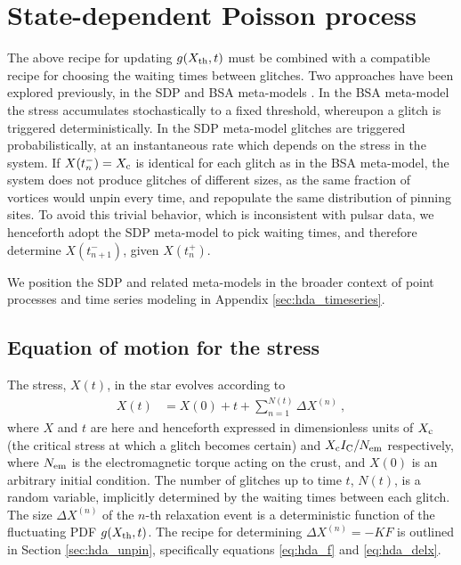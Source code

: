 \section{State-dependent Poisson process} \label{sec:hda_sdp}
The above recipe for updating $g(X_{\rm th},t)$ must be combined with a compatible recipe for choosing the waiting times between glitches. Two approaches have been explored previously, in the SDP \citep{Fulgenzi2017, Carlin2019quasi} and BSA meta-models \citep{Carlin2020bsa}. In the BSA meta-model the stress accumulates stochastically to a fixed threshold, whereupon a glitch is triggered deterministically. In the SDP meta-model glitches are triggered probabilistically, at an instantaneous rate which depends on the stress in the system. If $X(t_n^-) = X_\textrm{c}$ is identical for each glitch as in the BSA meta-model, the system does not produce glitches of different sizes, as the same fraction of vortices would unpin every time, and repopulate the same distribution of pinning sites. To avoid this trivial behavior, which is inconsistent with pulsar data, we henceforth adopt the SDP meta-model to pick waiting times, and therefore determine $X(t_{n+1}^-)$, given $X(t_n^+)$.

We position the SDP and related meta-models in the broader context of point processes and time series modeling in Appendix \ref{sec:hda_timeseries}.

\subsection{Equation of motion for the stress} \label{sec:hda_xeom}
The stress, $X(t)$, in the star evolves according to 
\begin{align}
X(t) &= X(0) + t + \sum_{n=1}^{N(t)} \Delta X^{(n)}\ , \label{eq:hda_xeom}
\end{align}
where $X$ and $t$ are here and henceforth expressed in dimensionless units of $X_\textrm{c}$ (the critical stress at which a glitch becomes certain) and $X_\textrm{c} I_{\rm C} / N_{\rm em}$ respectively, where $N_{\rm em}$ is the electromagnetic torque acting on the crust, and $X(0)$ is an arbitrary initial condition. The number of glitches up to time $t$, $N(t)$, is a random variable, implicitly determined by the waiting times between each glitch. The size $\Delta X^{(n)}$ of the $n$-th relaxation event is a deterministic function of the fluctuating PDF $g(X_{\rm th}, t)$. The recipe for determining $\Delta X^{(n)} = -KF$ is outlined in Section \ref{sec:hda_unpin}, specifically equations \eqref{eq:hda_f} and \eqref{eq:hda_delx}.

